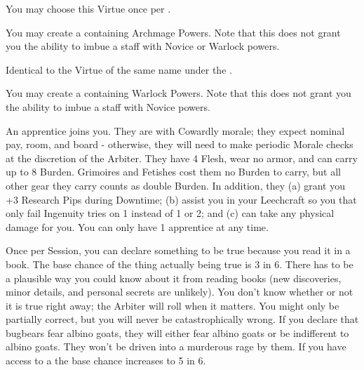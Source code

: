 \begin{multicols*}{2}
You may choose this Virtue once per \LVL.


You may create a  containing Archmage Powers. Note that this does not grant you the ability to imbue a staff with Novice or Warlock powers.


Identical to the Virtue of the same name under the .


You may create a  containing Warlock Powers. Note that this does not grant you the ability to imbue a staff with Novice powers.


An apprentice joins you.  They are  with Cowardly morale; they expect nominal pay, room, and board - otherwise, they will need to make periodic Morale checks at the discretion of the Arbiter.  They have 4 Flesh, wear no armor, and can carry up to 8 Burden. Grimoires and Fetishes cost them no Burden to carry, but all other gear they carry counts as double Burden.  In addition, they (a) grant you +3 Research Pips during Downtime; (b) assist you in your Leechcraft so you that only fail Ingenuity tries on 1 instead of 1 or 2; and (c) can take any physical damage for you.  You can only have 1 apprentice at any time.


Once per Session, you can declare something to be true because you read it in a book. The base chance of the thing actually being true is 3 in 6. There has to be a plausible way you could know about it from reading books (new discoveries, minor details, and personal secrets are unlikely). You don't know whether or not it is true right away; the Arbiter will roll when it matters. You might only be partially correct, but you will never be catastrophically wrong. If you declare that bugbears fear albino goats, they will either fear albino goats or be indifferent to albino goats. They won't be driven into a murderous rage by them. If you have access to a  the base chance increases to 5 in 6.

\cbreak




\end{multicols*}

